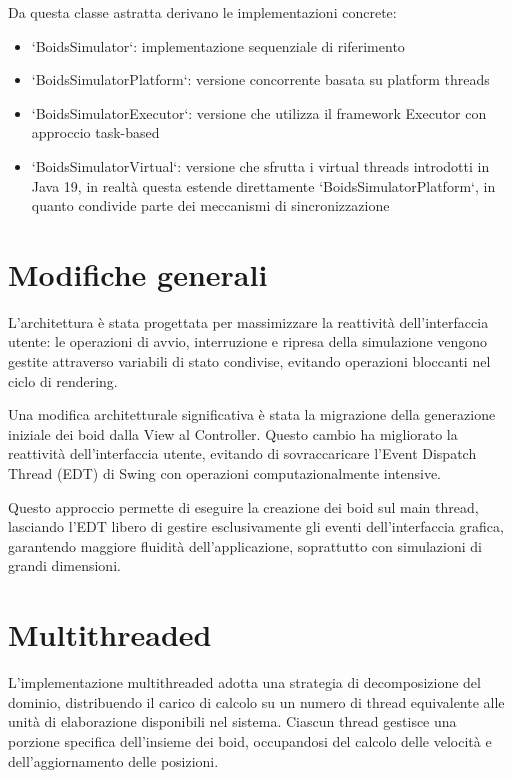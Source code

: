 \documentclass[a4paper,12pt]{report}
\begin{document}
    Da questa classe astratta derivano le implementazioni concrete:
    \begin{itemize}
        \item `BoidsSimulator`: implementazione sequenziale di riferimento
        \item `BoidsSimulatorPlatform`: versione concorrente basata su platform threads
        \item `BoidsSimulatorExecutor`: versione che utilizza il framework Executor con approccio task-based
        \item `BoidsSimulatorVirtual`: versione che sfrutta i virtual threads introdotti in Java 19, in realtà questa estende direttamente `BoidsSimulatorPlatform`, in quanto condivide parte dei meccanismi di sincronizzazione
    \end{itemize}
    
    \section{Modifiche generali}
    
        L'architettura è stata progettata per massimizzare la reattività dell'interfaccia utente: le operazioni di avvio, interruzione e ripresa della simulazione vengono gestite attraverso variabili di stato condivise, evitando operazioni bloccanti nel ciclo di rendering.
        
        Una modifica architetturale significativa è stata la migrazione della generazione iniziale dei boid dalla View al Controller. Questo cambio ha migliorato la reattività dell'interfaccia utente, evitando di sovraccaricare l'Event Dispatch Thread (EDT) di Swing con operazioni computazionalmente intensive.
        
        Questo approccio permette di eseguire la creazione dei boid sul main thread, lasciando l'EDT libero di gestire esclusivamente gli eventi dell'interfaccia grafica, garantendo maggiore fluidità dell'applicazione, soprattutto con simulazioni di grandi dimensioni.
    
    \section{Multithreaded}
        L'implementazione multithreaded adotta una strategia di decomposizione del dominio, distribuendo il carico di calcolo su un numero di thread equivalente alle unità di elaborazione disponibili nel sistema. Ciascun thread gestisce una porzione specifica dell'insieme dei boid, occupandosi del calcolo delle velocità e dell'aggiornamento delle posizioni.
        
\end{document}
